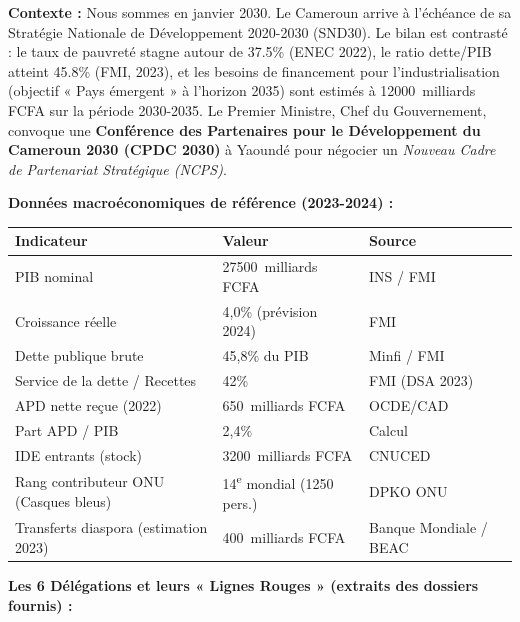 \documentclass[11pt]{article}
\newcommand{\cle}[1]{{\popxbold\color{popdark}#1}}
\newcounter{popsec}
\newcounter{popsub}
\newcommand{\courssub}[1]{%
  \stepcounter{popsub}%
  \par\vspace{9pt}\noindent{\popxbold\fontsize{11.5}{13}\selectfont\color{popink}{\color{poporange}\thepopsec.\thepopsub}\hspace{6pt}#1}\par\nopagebreak\vspace{4pt}
}
\begin{document}
\courssub{Situation}
\textbf{Contexte :} Nous sommes en janvier 2030. Le Cameroun arrive à l'échéance de sa \cle{Stratégie Nationale de Développement 2020-2030 (SND30)}. Le bilan est contrasté : le taux de pauvreté stagne autour de \num{37,5}\% (ENEC 2022), le ratio dette/PIB atteint \num{45,8}\% (FMI, 2023), et les besoins de financement pour l'industrialisation (objectif « Pays émergent » à l'horizon 2035) sont estimés à \SI{12000}{milliards} FCFA sur la période 2030-2035. Le Premier Ministre, Chef du Gouvernement, convoque une \textbf{Conférence des Partenaires pour le Développement du Cameroun 2030 (CPDC 2030)} à Yaoundé pour négocier un \emph{Nouveau Cadre de Partenariat Stratégique (NCPS)}.

\textbf{Données macroéconomiques de référence (2023-2024) :}
\begin{center}
\begin{tabularx}{\linewidth}{|l|X|X|}\hline
\textbf{Indicateur} & \textbf{Valeur} & \textbf{Source} \\ \hline
PIB nominal & \SI{27500}{milliards} FCFA & INS / FMI \\ \hline
Croissance réelle & 4,0\% (prévision 2024) & FMI \\ \hline
Dette publique brute & 45,8\% du PIB & Minfi / FMI \\ \hline
Service de la dette / Recettes & 42\% & FMI (DSA 2023) \\ \hline
APD nette reçue (2022) & \SI{650}{milliards} FCFA & OCDE/CAD \\ \hline
Part APD / PIB & 2,4\% & Calcul \\ \hline
IDE entrants (stock) & \SI{3200}{milliards} FCFA & CNUCED \\ \hline
Rang contributeur ONU (Casques bleus) & 14\textsuperscript{e} mondial (\num{1250} pers.) & DPKO ONU \\ \hline
Transferts diaspora (estimation 2023) & \SI{400}{milliards} FCFA & Banque Mondiale / BEAC \\ \hline
\end{tabularx}
\end{center}

\textbf{Les 6 Délégations et leurs « Lignes Rouges » (extraits des dossiers fournis) :}
\end{document}
